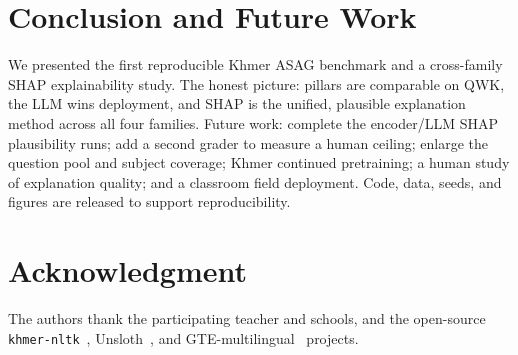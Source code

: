 \documentclass[journal]{IEEEtran}
\begin{document}
\section{Conclusion and Future Work}
We presented the first reproducible Khmer ASAG benchmark and a cross-family SHAP explainability study.
The honest picture: pillars are comparable on QWK, the LLM wins deployment, and SHAP is the unified,
plausible explanation method across all four families. Future work: complete the encoder/LLM SHAP
plausibility runs; add a second grader to measure a human ceiling; enlarge the question pool and
subject coverage; Khmer continued pretraining; a human study of explanation quality; and a classroom
field deployment. Code, data, seeds, and figures are released to support reproducibility.

\section*{Acknowledgment}
The authors thank the participating teacher and schools, and the open-source
\texttt{khmer-nltk}~\cite{khmernltk2020}, Unsloth~\cite{unsloth}, and
GTE-multilingual~\cite{gte2024} projects.



\end{document}
